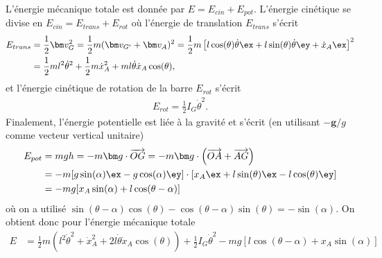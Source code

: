 \par\vspace{2mm}
L'énergie mécanique totale est donnée par $E = E_{cin} + E_{pot}$.
L'énergie cinétique se divise en $E_{cin} = E_{trans} + E_{rot}$ o\`u l'énergie de translation $E_{trans}$ s'écrit
\begin{align}
    E_{trans} &= \frac{1}{2} \bm v_G^2 = \frac{1}{2} m (\bm v_{G'} + \bm v_{A})^2 = \frac{1}{2} m \left[l\cos(\theta)\dot\theta \ex + l\sin(\theta)\dot\theta \ey + \dot x_A \ex\right]^2 \nonumber\\
    &=\frac{1}{2}ml^2\dot\theta^2 + \frac{1}{2}m\dot x_A^2 + ml\dot\theta \dot x_A \cos(\theta),
    \label{eq:Ecin}
\end{align}
et l'énergie cinétique de rotation de la barre $E_{rot}$ s'écrit
\begin{align}
    E_{rot} = \frac{1}{2} I_G \dot\theta^2.
    \label{eq:Erot}
\end{align}
Finalement, l'énergie potentielle est liée à la gravité et s'écrit (en utilisant $-\bm g/g$ comme vecteur vertical unitaire)
\begin{align}
    E_{pot} &= mgh = -m\bm g \cdot \overrightarrow{OG} =-m\bm g \cdot \left(\overrightarrow{OA}+\overrightarrow{AG}\right)\nonumber\\
    &= -m[g\sin(\alpha)\ex - g\cos(\alpha)\ey] \cdot [x_A \ex +l\sin(\theta)\ex - l\cos(\theta)\ey]\nonumber\\
    &= -mg [x_A\sin(\alpha) + l\cos(\theta-\alpha)]
    \label{eq:Epot}
\end{align}
o\`u on a utilisé $\sin(\theta-\alpha)\cos(\theta) - \cos(\theta-\alpha)\sin(\theta) = -\sin(\alpha)$.
On obtient donc pour l'énergie mécanique totale
\begin{align}
    E
    &=\frac{1}{2}m\left(l^2\dot\theta^2 + \dot x_A^2 + 2l\dot\theta \dot x_A \cos(\theta)\right) + \frac{1}{2} I_G \dot\theta^2 -mg\left[l\cos(\theta-\alpha) + x_A\sin(\alpha)\right]
    \label{eq:Emec}
\end{align}
